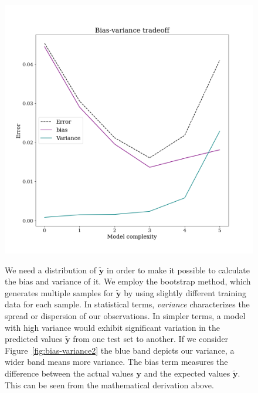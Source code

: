 \documentclass[twoside,11pt]{report}
\begin{document}
\begin{figure}[!h]
\begin{minipage}[!t]{.48\linewidth}
    \begin{center}
        \includegraphics[width=1.0\textwidth]{../runsAndAdditions/bias-variance1.png}
        \caption{}\label{fig:bias-variance1}
    \end{center}
\end{minipage}
\hspace{2mm}
\begin{minipage}[!t]{.45\linewidth}
We need a distribution of $\mathbf{\tilde{y}}$ in order to make it possible to calculate the bias and variance of it.
We employ the bootstrap method, which generates 
multiple samples for $\mathbf{\tilde{y}}$ by using slightly different training data for each sample.
In statistical terms, \emph{variance} characterizes the spread or dispersion of our observations.
In simpler terms, a model with high variance would exhibit significant variation in the predicted values 
$\mathbf{\tilde{y}}$ from one test set to another.
If we consider Figure~\ref{fig:bias-variance2} the blue band depicts our variance, a wider band means more variance. 
The bias term measures the difference between the actual values $\mathbf{y}$ and the
expected values $\mathbf{\tilde{y}}$. This can be seen from the mathematical derivation above.
\end{minipage}
\end{figure}
\end{document}
